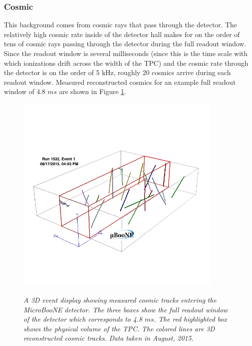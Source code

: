 \subsubsection{Cosmic}
This background comes from cosmic rays that pass through the detector. The relatively high cosmic rate inside of the detector hall makes for on the order of tens of cosmic rays passing through the detector during the full readout window. Since the readout window is several milliseconds (since this is the time scale with which ionizations drift across the width of the TPC) and the cosmic rate through the detector is on the order of 5 kHz, roughly 20 cosmics arrive during each readout window. Measured reconstructed cosmics for an example full readout window of 4.8 $ms$ are shown in Figure \ref{UB_publicplot_3dcosmics}.\\


\begin{figure}[ht!]
\centering
\includegraphics[width=0.9\textwidth]{Figures/UB_publicplot_3dcosmics.png}\\
\caption{\textit{A 3D event display showing measured cosmic tracks entering the MicroBooNE detector. The three boxes show the full readout window of the detector which corresponds to 4.8 $ms$. The red highlighted box shows the physical volume of the TPC. The colored lines are 3D reconstructed cosmic tracks. Data taken in August, 2015.}}
\label{UB_publicplot_3dcosmics}
\end{figure}


